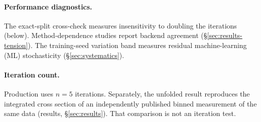 \paragraph{Performance diagnostics.} The exact-split cross-check measures insensitivity to doubling the iterations (below). Method-dependence studies report backend agreement (\S\ref{sec:results-tension}). The training-seed variation band measures residual machine-learning (ML) stochasticity (\S\ref{sec:systematics}).

\paragraph{Iteration count.} Production uses $n=5$ iterations. Separately, the unfolded result reproduces the integrated cross section of an independently published binned measurement of the same data (results, \S\ref{sec:results}). That comparison is not an iteration test.

